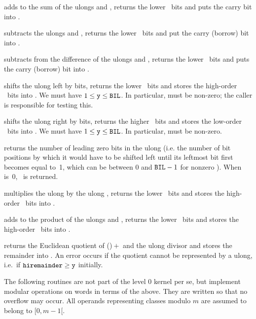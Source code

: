  adds  to the sum of the
ulongs  and , returns the lower \B\ bits and puts the
carry bit into .

 subtracts the ulongs  and ,
returns the lower \B\ bits and put the carry (borrow) bit into .

 subtracts  from the
difference of the ulongs  and , returns the lower \B\ bits
and puts the carry (borrow) bit into .

 shifts the ulong  left by 
bits, returns the lower \B\ bits and stores the high-order \B\ bits into
. We must have $1\le{\tt y}\le{\tt BIL}$. In particular, 
must be non-zero; the caller is responsible for testing this.

 shifts the ulong  right
by  bits, returns the higher \B\ bits and stores the low-order
\B\ bits into . We must have $1\le{\tt y}\le{\tt BIL}$. In
particular,  must be non-zero.

 returns the number of leading zero bits in the
ulong  (i.e. the number of bit positions by which it would have to be
shifted left until its leftmost bit first becomes equal to~1, which can be
between 0 and ${\tt BIL}-1$ for nonzero ). When  is~0, \B\ is returned.

 multiplies the ulong  by the ulong
, returns the lower \B\ bits and stores the high-order \B\ bits into
.

 adds  to the product
of the ulongs  and , returns the lower \B\ bits and stores the
high-order \B\ bits into .

 returns the Euclidean quotient of
()${}+{}$ and the ulong divisor  and
stores the remainder into . An error occurs if the quotient
cannot be represented by a ulong, i.e.~if ${\tt hiremainder}\ge{\tt y}$
initially.


The following routines are not part of the level 0 kernel per se, but
implement modular operations on words in terms of the above. They are written
so that no overflow may occur. All operands representing classes modulo $m$
are assumed to belong to $[0,m-1[$.

